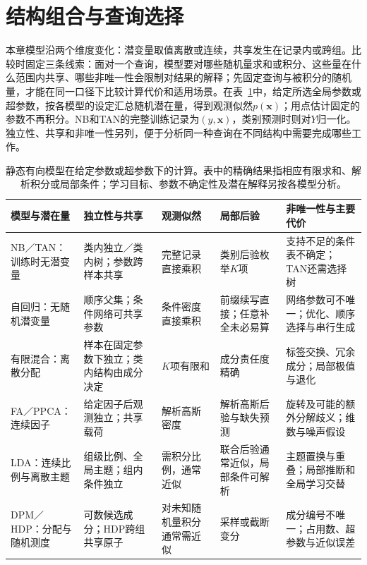\section{结构组合与查询选择}
\label{sec:pgm-static-directed-comparison}

本章模型沿两个维度变化：潜变量取值离散或连续，共享发生在记录内或跨组。比较时固定三条线索：面对一个查询，模型要对哪些随机量求和或积分、这些量在什么范围内共享、哪些非唯一性会限制对结果的解释；先固定查询与被积分的随机量，才能在同一口径下比较计算代价和适用场景。在表~\ref{tab:pgm-static-directed-comparison}中，给定所选全局参数或超参数，按各模型的设定汇总随机潜在量，得到观测似然$p(\bm x)$；用点估计固定的参数不再积分。NB和TAN的完整训练记录为$(y,\bm x)$，类别预测时则对$Y$归一化。独立性、共享和非唯一性另列，便于分析同一种查询在不同结构中需要完成哪些工作。

\begin{table}[htbp]
  \centering
  \small
  \begin{tabularx}{\linewidth}{@{}
    >{\raggedright\arraybackslash}p{28mm}
    >{\raggedright\arraybackslash}p{30mm}
    >{\raggedright\arraybackslash}p{27mm}
    >{\raggedright\arraybackslash}p{30mm}
    >{\raggedright\arraybackslash}X@{}}
    \toprule
    模型与潜在量 & 独立性与共享 & 观测似然 & 局部后验 & 非唯一性与主要代价\\
    \midrule
    NB／TAN：训练时无潜变量 &
    类内独立／类内树；参数跨样本共享 &
    完整记录直接乘积 &
    类别后验枚举$K$项 &
    支持不足的条件表不确定；TAN还需选择树\\
    自回归：无随机潜变量 &
    顺序父集；条件网络可共享参数 &
    条件密度直接乘积 &
    前缀续写直接；任意补全未必易算 &
    网络参数可不唯一；优化、顺序选择与串行生成\\
    有限混合：离散分配 &
    样本在固定参数下独立；类内结构由成分决定 &
    $K$项有限和 &
    成分责任度精确 &
    标签交换、冗余成分；局部极值与退化\\
    FA／PPCA：连续因子 &
    给定因子后观测独立；共享载荷 &
    解析高斯密度 &
    解析高斯后验与缺失预测 &
    旋转及可能的额外分解歧义；维数与噪声假设\\
    LDA：连续比例与离散主题 &
    组级比例、全局主题；组内条件独立 &
    需积分比例，通常近似 &
    联合后验通常近似，局部条件可解析 &
    主题置换与重叠；局部推断和全局学习交替\\
    DPM／HDP：分配与随机测度 &
    可数候选成分；HDP跨组共享原子 &
    对未知随机量积分通常需近似 &
    采样或截断变分 &
    成分编号不唯一；占用数、超参数与近似误差\\
    \bottomrule
  \end{tabularx}
  \caption{静态有向模型在给定参数或超参数下的计算。表中的精确结果指相应有限求和、解析积分或局部条件；学习目标、参数不确定性及潜在解释另按各模型分析。}
  \label{tab:pgm-static-directed-comparison}
\end{table}

